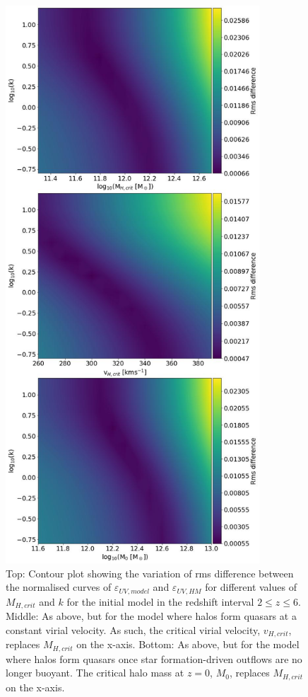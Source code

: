 \documentclass[12pt, twocolumn]{article}%
\begin{document}
\begin{figure}[H]
\centering
\includegraphics[width=9.5cm]{Plot_11.jpeg}
\caption{Top: Contour plot showing the variation of rms difference between the normalised curves of $\varepsilon_{UV,model}$ and $\varepsilon_{UV,HM}$ for different values of $M_{H,crit}$ and $k$ for the initial model in the redshift interval $2\leq z\leq6$. Middle: As above, but for the model where halos form quasars at a constant virial velocity. As such, the critical virial velocity, $v_{H,crit}$, replaces $M_{H,crit}$ on the x-axis. Bottom: As above, but for the model where halos form quasars once star formation-driven outflows are no longer buoyant. The critical halo mass at $z=0$, $M_0$, replaces $M_{H,crit}$ on the x-axis.}
\label{fig:12}
\end{figure}
\clearpage
\twocolumngrid
\end{document}
